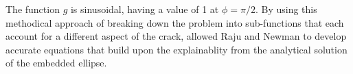 The function $g$ is sinusoidal, having a value of 1 at $\phi = \pi/2$.  By using this methodical approach of breaking down the problem into sub-functions that each account for a different aspect of the crack, allowed Raju and Newman to develop accurate equations that build upon the explainablity from the analytical solution of the embedded ellipse. 
